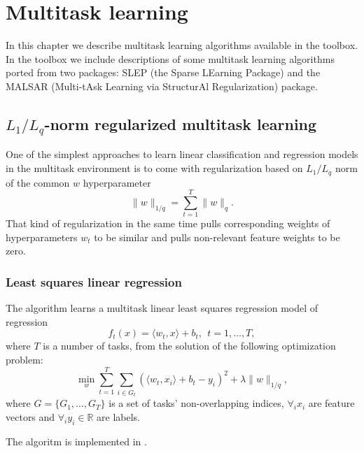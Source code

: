 %

\chapter{Multitask learning}

In this chapter we describe multitask learning algorithms available in the 
\shogun{} toolbox. In the toolbox we include descriptions of some multitask 
learning algorithms ported from two packages: SLEP (the Sparse LEarning 
Package) and the MALSAR (Multi-tAsk Learning via StructurAl Regularization) 
package.

\section{$L_1/L_q$-norm regularized multitask learning}

One of the simplest approaches to learn linear classification and regression models in the 
multitask environment is to come with regularization based on $L_1/L_q$ norm 
of the common $w$ hyperparameter
$$
\| w \|_{1/q} = \sum_{t=1}^{T} \| w \|_q.
$$ 
That kind of regularization in the same time pulls corresponding weights 
of hyperparameters $w_t$ to be similar and pulls non-relevant feature weights
to be zero.

\subsection{Least squares linear regression}

The algorithm learns a multitask linear least squares regression model of regression 
$$
f_t(x) = \langle w_t,x \rangle + b_t, ~~ t = 1, \dots, T,
$$
where $T$ is a number of tasks, from the solution of the following optimization problem:
$$
\min_w \sum_{t=1}^{T} \sum_{i \in G_t} \left(\langle w_t,x_i \rangle + b_t - y_i\right)^2
+ \lambda \| w \|_{1/q},
$$
where $G = \{ G_1, \dots, G_T \}$ is a set of tasks' non-overlapping indices, $\forall_i x_i$ are feature 
vectors and $\forall_i y_i \in \mathbb{R}$ are labels.

The algoritm is implemented in .


